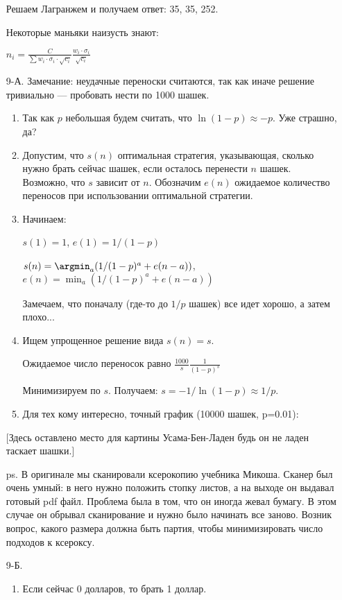 \begin{enumerate}
Решаем Лагранжем и получаем ответ: 35, 35, 252.

Некоторые маньяки наизусть знают:

$n_{i}=\frac{C}{\sum w_{i}\cdot \sigma_{i}\cdot\sqrt{c_{i}}}\frac{w_{i}\cdot \sigma_{i}}{\sqrt{c_{i}}}$
\item[9-А.] Замечание: неудачные переноски считаются, так как иначе решение
тривиально — пробовать нести по 1000 шашек.
\begin{enumerate}
\item  Так как $p$ небольшая будем считать, что $\ln(1-p)\approx -p$. Уже страшно, да?
\item Допустим, что $s(n)$ оптимальная стратегия, указывающая, сколько нужно брать
сейчас шашек, если осталось перенести $n$ шашек. Возможно, что $s$ зависит от $n$.
Обозначим $e(n)$ ожидаемое количество переносов при использовании оптимальной стратегии.
\item Начинаем:

$s(1)=1$, $e(1)=1/(1-p)$

$s(n)=\argmin_{a}(1/(1-p)^{a}+e(n-a))$, $e(n)=\min_{a}(1/(1-p)^{a}+e(n-a))$

Замечаем, что поначалу (где-то до $1/p$ шашек) все идет хорошо, а затем плохо...
\item Ищем упрощенное решение вида $s(n)=s$.

Ожидаемое число переносок равно $\frac{1000}{s}\frac{1}{(1-p)^{s}}$

Минимизируем по $s$. Получаем: $s=-1/\ln(1-p)\approx 1/p$.
\item Для тех кому интересно, точный график (10000 шашек, p=0.01):
\end{enumerate}

$[$Здесь оставлено место для картины Усама-Бен-Ладен будь он не ладен таскает шашки.$]$

ps. В оригинале мы сканировали ксерокопию учебника Микоша. Сканер был очень умный:
в него нужно положить стопку листов, а на выходе он выдавал готовый pdf файл.
Проблема была в том, что он иногда жевал бумагу. В этом случае он обрывал
сканирование и нужно было начинать все заново. Возник вопрос, какого размера должна
быть партия, чтобы минимизировать число подходов к ксероксу.

\item[9-Б.]
\begin{enumerate}
\item Если сейчас 0 долларов, то брать 1 доллар.


\end{enumerate}
\end{enumerate}
